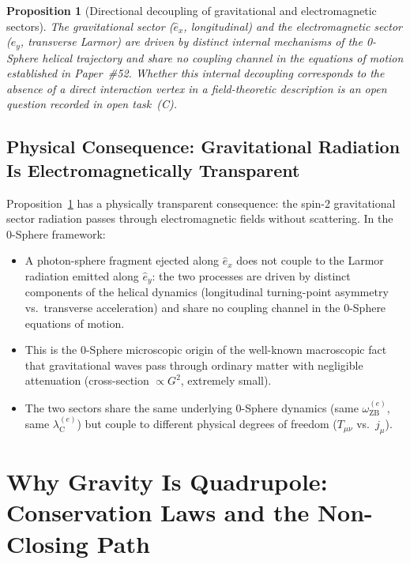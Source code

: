 \documentclass[%
 reprint, amsmath,amssymb, aps, prd, ]{revtex4-2}
\numberwithin{equation}{section}
\newtheorem{proposition}[theorem]{Proposition}
\newcommand{\ehat}[1]{\hat{e}_{#1}}
\newcommand{\lambdaCe}{\lambda_{\mathrm{C}}^{(e)}}
\newcommand{\omZBe}{\omega_{\mathrm{ZB}}^{(e)}}
\begin{document}
\begin{proposition}[Directional decoupling of gravitational and electromagnetic sectors]
\label{prop:ortho}
The gravitational sector ($\ehat{x}$, longitudinal) and the electromagnetic sector ($\ehat{y}$, transverse Larmor) are driven by distinct internal mechanisms of the 0-Sphere helical trajectory and share no coupling channel in the equations of motion established in Paper~\#52.
Whether this internal decoupling corresponds to the absence of a direct interaction vertex in a field-theoretic description is an open question recorded in open task~(C).
\end{proposition}

\subsection{Physical Consequence: Gravitational Radiation Is Electromagnetically Transparent}

Proposition~\ref{prop:ortho} has a physically transparent consequence: the spin-2 gravitational sector radiation passes through electromagnetic fields without scattering.
In the 0-Sphere framework:
\begin{itemize}[leftmargin=2em, itemsep=2pt]
\item A photon-sphere fragment ejected along $\ehat{x}$ does not couple to the Larmor radiation emitted along $\ehat{y}$: the two processes are driven by distinct components of the helical dynamics (longitudinal turning-point asymmetry vs.\ transverse acceleration) and share no coupling channel in the 0-Sphere equations of motion.
\item This is the 0-Sphere microscopic origin of the well-known macroscopic fact that gravitational waves pass through ordinary matter with negligible attenuation (cross-section $\propto G^2$, extremely small).
\item The two sectors share the same underlying 0-Sphere dynamics (same $\omZBe$, same $\lambdaCe$) but couple to different physical degrees of freedom ($T_{\mu\nu}$ vs.\ $j_\mu$).
\end{itemize}

\section{Why Gravity Is Quadrupole: Conservation Laws and the Non-Closing Path}
\label{sec:quadrupole_selection}
\end{document}
